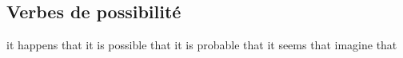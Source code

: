 
\subsection*{Verbes de possibilité}
 { }   {it happens that}
   {it is possible that}
   {it is probable that}
   {it seems that}
   {imagine that}
